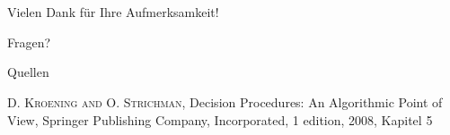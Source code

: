 \documentclass[hyperref={pdfpagelabels=false}]{beamer}
\begin{document}
\section{}
\begin{frame}
	\center
	Vielen Dank für Ihre Aufmerksamkeit!

	Fragen?
	\begin{block}{Quellen}
		\begin{thebibliography}{99}
			\textsc{D. Kroening and O. Strichman},
			Decision Procedures: An Algorithmic Point of View,
			Springer Publishing Company, Incorporated, 1 edition, 2008,
			Kapitel 5
		\end{thebibliography}
	\end{block}
\end{frame}
\end{document}
